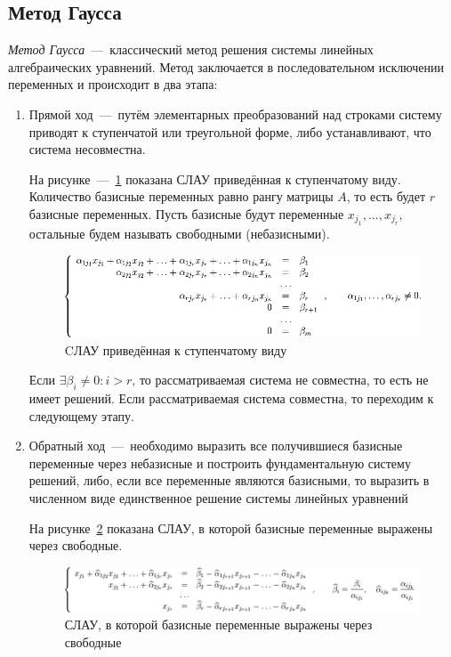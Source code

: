 \documentclass[12pt,a4paper,oneside]{extarticle}
\begin{document}
    \subsection{Метод Гаусса}
        {\it Метод Гаусса}~---~классический метод решения системы линейных алгебраических уравнений. Метод заключается в последовательном исключении переменных и происходит в два этапа:
        \begin{enumerate}
            \item Прямой ход~---~путём элементарных преобразований над строками систему приводят к ступенчатой или треугольной форме, либо устанавливают, что система несовместна.

                На рисунке~---~\ref{pic:gaussian1} показана СЛАУ приведённая к ступенчатому виду. Количество базисные переменных равно рангу матрицы $A$, то есть будет $r$ базисные переменных. Пусть базисные будут переменные $x_{j_1}, ..., x_{j_r}$, остальные будем называть свободными (небазисными). 
                \begin{figure}[h!]
                    \centering
                    \includegraphics[scale=0.65]{gaussian1.png}
                    \caption{CЛАУ приведённая к ступенчатому виду}
                    \label{pic:gaussian1}
                \end{figure}

                Если $\exists \beta_i \neq 0 \colon i>r$, то рассматриваемая система не совместна, то есть не имеет решений. Если рассматриваемая система совместна, то переходим к следующему этапу.

            \item Обратный ход~---~необходимо выразить все получившиеся базисные переменные через небазисные и построить фундаментальную систему решений, либо, если все переменные являются базисными, то выразить в численном виде единственное решение системы линейных уравнений

                На рисунке~\ref{pic:gaussian2} показана СЛАУ, в которой базисные переменные выражены через свободные.
                \begin{figure}[h!]
                    \centering
                    \includegraphics[scale=0.45]{gaussian2.png}
                    \caption{СЛАУ, в которой базисные переменные выражены через свободные}
                    \label{pic:gaussian2}
                \end{figure}


\end{enumerate}
\end{document}
